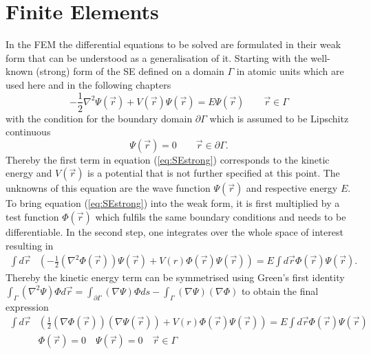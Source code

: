\section{Finite Elements}
\label{ch:introFEM}
In the FEM the differential equations to be solved are formulated in their weak form that can be understood as a generalisation of it.
Starting with the well-known (strong) form of the SE defined on a domain $ \Gamma$ in atomic units which are used here and in the following chapters
\begin{equation} \label{eq:SEstrong}
-\frac 12 \nabla^2\Psi(\vec{r})+ V(\vec{r})\Psi(\vec{r})=E \Psi(\vec{r}) \qquad  \vec{r}\in \Gamma
\end{equation}
with the condition for the boundary domain $\partial \Gamma$ which is assumed to be Lipschitz continuous
\begin{equation}
    \Psi(\vec{r})=0  \qquad \vec{r} \in \partial \Gamma.
\end{equation}
Thereby the first term in equation (\ref{eq:SEstrong}) corresponds to the kinetic energy and $V(\vec{r})$ is a potential that is not further specified at this point.
The unknowns of this equation are the wave function $\Psi(\vec{r})$ and respective energy $E$.
To bring equation (\ref{eq:SEstrong}) into the weak form, it is first multiplied by a test function $\Phi(\vec{r})$ which fulfils the same boundary conditions and needs to be differentiable.
In the second step, one integrates over the whole space of interest resulting in
\begin{align}
\int d \vec{r} & \left( - \frac 12 \left(\nabla^2\Phi(\vec{r})\right)\Psi(\vec{r})
               + V(r) \Phi(\vec{r}) \Psi(\vec{r})\right) = E \int d \vec{r} \Phi(\vec{r}) \Psi(\vec{r}).
\end{align}
Thereby the kinetic energy term can be symmetrised using Green's first identity $\int_\Gamma (\nabla^2\Psi)\Phi d\vec{r}=\int_{\partial \Gamma} (\nabla\Psi)\Phi ds -\int_\Gamma (\nabla\Psi)(\nabla\Phi)$ to obtain the final expression
\begin{align}\label{eq:SEweak}
\int d \vec{r} & \left(  \frac 12 \left(\nabla\Phi(\vec{r})\right) \left(\nabla\Psi(\vec{r})\right) 
               + V(r) \Phi(\vec{r}) \Psi(\vec{r})\right) = E \int d \vec{r} \Phi(\vec{r}) \Psi(\vec{r})\\
    &\Phi(\vec{r})=0\quad
     \Psi(\vec{r})=0\quad  \vec{r}\in\Gamma
\end{align}
